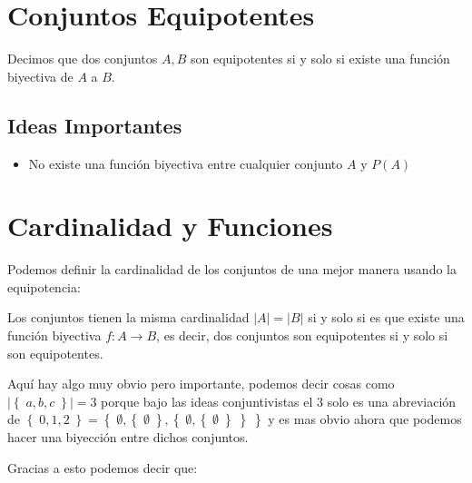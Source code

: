 \documentclass[12pt, fleqn]{report}                             %
\theoremstyle{break}                                            %
\newcommand{\Set}[1]            {\left\{ \; #1 \; \right\}}     %
\begin{document}
        \section{Conjuntos Equipotentes}

            Decimos que dos conjuntos $A, B$ son equipotentes si y solo si existe una función 
            biyectiva de $A$ a $B$.


            \subsection{Ideas Importantes}

                \begin{itemize}
                    \item No existe una función biyectiva entre cualquier conjunto $A$
                        y $P(A)$
                \end{itemize}

        \section{Cardinalidad y Funciones}

            Podemos definir la cardinalidad de los conjuntos de una mejor manera
            usando la equipotencia:

            Los conjuntos tienen la misma cardinalidad $|A| = |B|$ si y solo si es que existe
            una función biyectiva $f : A \to B$, es decir, dos conjuntos son equipotentes si y solo
            si son equipotentes.

            Aquí hay algo muy obvio pero importante, podemos decir cosas como
            $|\Set{a, b, c}| = 3$ porque bajo las ideas conjuntivistas el 3 solo es una abreviación
            de $\Set{0, 1, 2} = \Set{\emptyset, \Set{\emptyset}, \Set{\emptyset, \Set{\emptyset}}}$
            y es mas obvio ahora que podemos hacer una biyección entre dichos conjuntos. 

            Gracias a esto podemos decir que:
\end{document}
